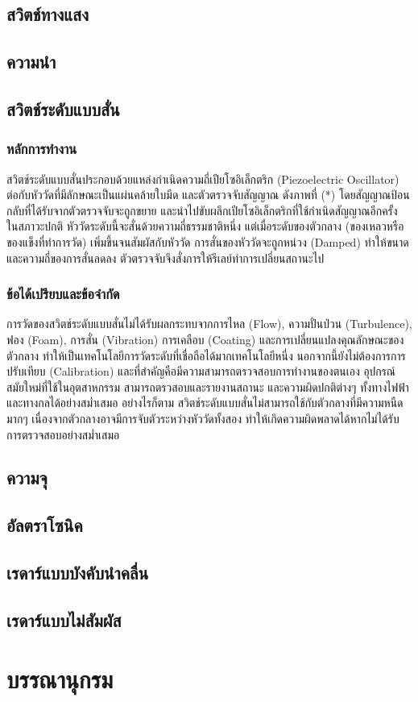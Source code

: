 \documentclass[final,11pt]{article}
\begin{document}
\subsection{สวิตช์ทางแสง}

\subsection{ความนำ}

\subsection{สวิตช์ระดับแบบสั่น}
\subsubsection{หลักการทำงาน}
สวิตช์ระดับแบบสั่นประกอบด้วยแหล่งกำเนิดความถี่เปียโซอิเล็กตริก (Piezoelectric Oscillator) ต่อกับหัววัดที่มีลักษณะเป็นแผ่นคล้ายใบมีด 
และตัวตรวจจับสัญญาณ ดังภาพที่ (*) โดยสัญญาณป้อนกลับที่ได้รับจากตัวตรวจจับจะถูกขยาย และนำไปขับผลึกเปียโซอิเล็กตริกที่ใช้กำเนิดสัญญาณอีกครั้ง
ในสภาวะปกติ หัววัดระดับนี้จะสั่นด้วยความถี่ธรรมชาติหนึ่ง แต่เมื่อระดับของตัวกลาง (ของเหลวหรือของแข็งที่ทำการวัด) เพิ่มขึ้นจนสัมผัสกับหัววัด 
การสั่นของหัววัดจะถูกหน่วง (Damped) ทำให้ขนาดและความถี่ของการสั่นลดลง ตัวตรวจจับจึงสั่งการให้รีเลย์ทำการเปลี่ยนสถานะไป
\subsubsection{ข้อได้เปรียบและข้อจำกัด}
การวัดของสวิตช์ระดับแบบสั่นไม่ได้รับผลกระทบจากการไหล (Flow), ความปั่นป่วน (Turbulence), ฟอง (Foam), การสั่น (Vibration)
การเคลือบ (Coating) และการเปลี่ยนแปลงคุณลักษณะของตัวกลาง ทำให้เป็นเทคโนโลยีการวัดระดับที่เชื่อถือได้มากเทคโนโลยีหนี่ง 
นอกจากนี้ยังไม่ต้องการการปรับเทียบ (Calibration) และที่สำคัญคือมีความสามารถตรวจสอบการทำงานของตนเอง อุปกรณ์สมัยใหม่ที่ใช้ในอุตสาหกรรม 
สามารถตรวสอบและรายงานสถานะ และความผิดปกติต่างๆ ทั้งทางไฟฟ้าและทางกลได้อย่างสม่ำเสมอ อย่างไรก็ตาม 
สวิตช์ระดับแบบสั่นไม่สามารถใช้กับตัวกลางที่มีความหนืดมากๆ เนื่องจากตัวกลางอาจมีการจับตัวระหว่างหัววัดทั้งสอง 
ทำให้เกิดความผิดพลาดได้หากไม่ได้รับการตรวจสอบอย่างสม่ำเสมอ 
\subsection{ความจุ}
\subsection{อัลตราโซนิค}
\subsection{เรดาร์แบบบังคับนำคลื่น}
\subsection{เรดาร์แบบไม่สัมผัส}
\section{บรรณานุกรม}
\end{document}

